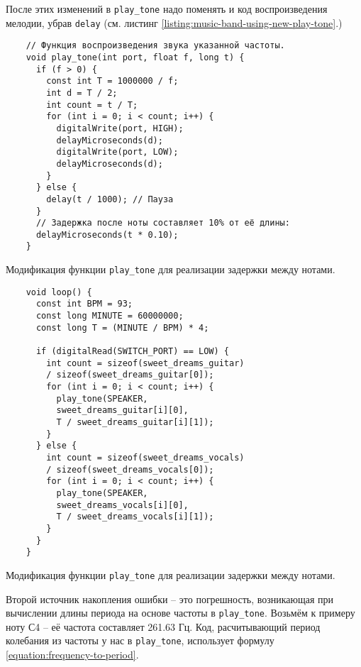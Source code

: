 \documentclass[../sparc.tex]{subfiles}
\begin{document}
После этих изменений в \texttt{play\_tone} надо поменять и код воспроизведения
мелодии, убрав \texttt{delay} (см. листинг
\ref{listing:music-band-using-new-play-tone}.)

\begin{listing}[H]
  \begin{verbatim}
    // Функция воспроизведения звука указанной частоты.
    void play_tone(int port, float f, long t) {
      if (f > 0) {
        const int T = 1000000 / f;
        int d = T / 2;
        int count = t / T;
        for (int i = 0; i < count; i++) {
          digitalWrite(port, HIGH);
          delayMicroseconds(d);
          digitalWrite(port, LOW);
          delayMicroseconds(d);
        }
      } else {
        delay(t / 1000); // Пауза
      }
      // Задержка после ноты составляет 10% от её длины:
      delayMicroseconds(t * 0.10);
    }
  \end{verbatim}
  \caption{Модификация функции \texttt{play\_tone} для реализации задержки между
    нотами.}
  \label{listing:music-band-play-tone-with-delay}
\end{listing}

\begin{listing}[H]
  \begin{verbatim}
    void loop() {
      const int BPM = 93;
      const long MINUTE = 60000000;
      const long T = (MINUTE / BPM) * 4;

      if (digitalRead(SWITCH_PORT) == LOW) {
        int count = sizeof(sweet_dreams_guitar)
        / sizeof(sweet_dreams_guitar[0]);
        for (int i = 0; i < count; i++) {
          play_tone(SPEAKER,
          sweet_dreams_guitar[i][0],
          T / sweet_dreams_guitar[i][1]);
        }
      } else {
        int count = sizeof(sweet_dreams_vocals)
        / sizeof(sweet_dreams_vocals[0]);
        for (int i = 0; i < count; i++) {
          play_tone(SPEAKER,
          sweet_dreams_vocals[i][0],
          T / sweet_dreams_vocals[i][1]);
        }
      }
    }
  \end{verbatim}
  \caption{Модификация функции \texttt{play\_tone} для реализации задержки между
    нотами.}
  \label{listing:music-band-using-new-play-tone}
\end{listing}

Второй источник накопления ошибки -- это погрешность, возникающая при вычислении
длины периода на основе частоты в \texttt{play\_tone}.  Возьмём к примеру ноту
С4 -- её частота составляет 261.63 Гц.  Код, расчитывающий период колебания из
частоты у нас в \texttt{play\_tone}, использует формулу
\ref{equation:frequency-to-period}.
\end{document}
